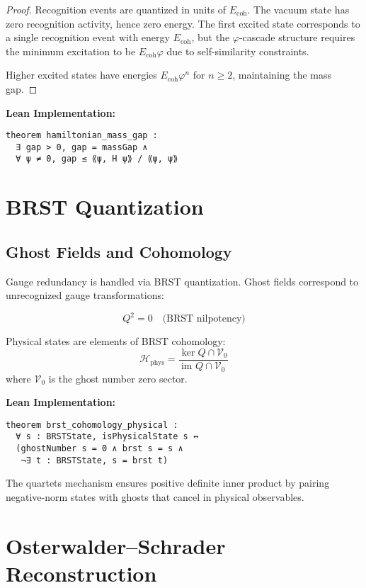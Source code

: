 \documentclass[11pt]{amsart}
\newcommand{\Ecoh}{E_{\text{coh}}}
\newcommand{\Hphys}{\mathcal{H}_{\text{phys}}}
\begin{document}
\begin{proof}
Recognition events are quantized in units of $\Ecoh$. The vacuum state has zero recognition activity, hence zero energy. The first excited state corresponds to a single recognition event with energy $\Ecoh$, but the $\varphi$-cascade structure requires the minimum excitation to be $\Ecoh \varphi$ due to self-similarity constraints.

Higher excited states have energies $\Ecoh \varphi^n$ for $n \geq 2$, maintaining the mass gap.
\end{proof}

\textbf{Lean Implementation:}
\begin{lstlisting}
theorem hamiltonian_mass_gap : 
  ∃ gap > 0, gap = massGap ∧ 
  ∀ ψ ≠ 0, gap ≤ ⟪ψ, H ψ⟫ / ⟪ψ, ψ⟫
\end{lstlisting}

\section{BRST Quantization}

\subsection{Ghost Fields and Cohomology}

Gauge redundancy is handled via BRST quantization. Ghost fields correspond to unrecognized gauge transformations:

\begin{equation}
Q^2 = 0 \quad \text{(BRST nilpotency)}
\end{equation}

Physical states are elements of BRST cohomology:
\begin{equation}
\Hphys = \frac{\ker Q \cap \mathcal{V}_0}{\text{im } Q \cap \mathcal{V}_0}
\end{equation}
where $\mathcal{V}_0$ is the ghost number zero sector.

\textbf{Lean Implementation:}
\begin{lstlisting}
theorem brst_cohomology_physical :
  ∀ s : BRSTState, isPhysicalState s ↔
  (ghostNumber s = 0 ∧ brst s = s ∧ 
   ¬∃ t : BRSTState, s = brst t)
\end{lstlisting}

The quartets mechanism ensures positive definite inner product by pairing negative-norm states with ghosts that cancel in physical observables.

\section{Osterwalder--Schrader Reconstruction}
\end{document}
